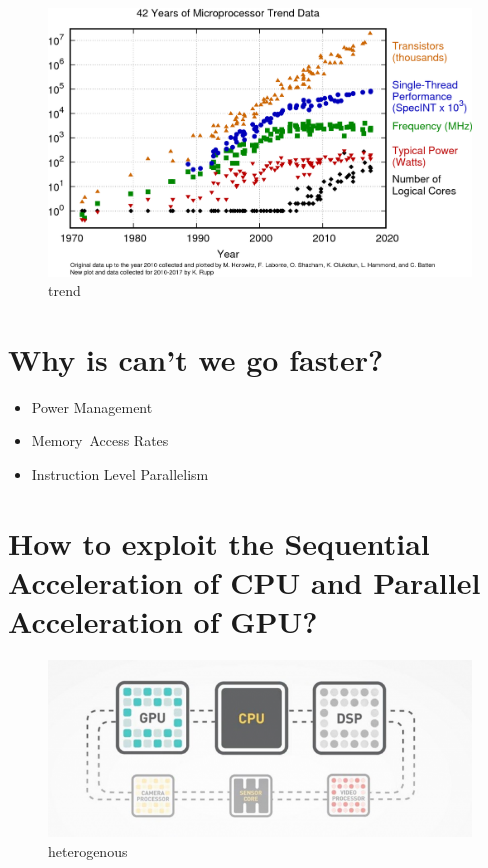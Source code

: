 \documentclass[11pt]{article}
\makeatletter
\def\maxwidth{\ifdim\Gin@nat@width>\linewidth\linewidth
    \else\Gin@nat@width\fi}
\let\Oldincludegraphics\includegraphics
\renewcommand{\includegraphics}[1]{\Oldincludegraphics[width=.8\maxwidth]{#1}}
\providecommand{\tightlist}{%
      \setlength{\itemsep}{0pt}\setlength{\parskip}{0pt}}
\makeatother
\begin{document}
    \begin{figure}
\centering
\includegraphics{images/42-years-processor-trend.png}
\caption{trend}
\end{figure}

    \section{Why is can't we go faster?}\label{why-is-cant-we-go-faster}

\begin{itemize}
\tightlist
\item
  Power Management
\item
  Memory~Access Rates
\item
  Instruction Level Parallelism
\end{itemize}

    \section{How to exploit the Sequential Acceleration of CPU and Parallel
Acceleration of
GPU?}\label{how-to-exploit-the-sequential-acceleration-of-cpu-and-parallel-acceleration-of-gpu}

\begin{figure}
\centering
\includegraphics{images/heterogenous_computing.png}
\caption{heterogenous}
\end{figure}
\end{document}
